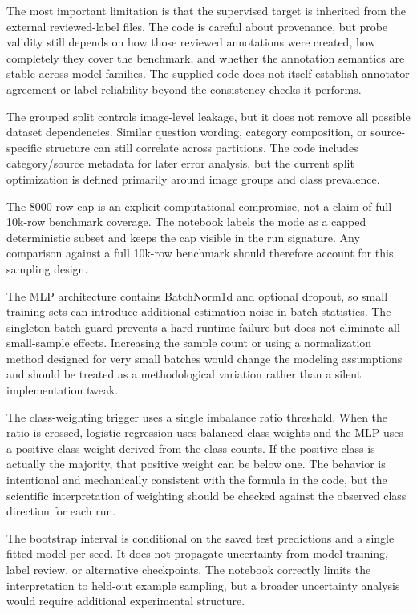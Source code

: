 \documentclass[11pt,a4paper]{article}
\begin{document}
The most important limitation is that the supervised target is inherited from the external reviewed-label files. The code is careful about provenance, but probe validity still depends on how those reviewed annotations were created, how completely they cover the benchmark, and whether the annotation semantics are stable across model families. The supplied code does not itself establish annotator agreement or label reliability beyond the consistency checks it performs.

The grouped split controls image-level leakage, but it does not remove all possible dataset dependencies. Similar question wording, category composition, or source-specific structure can still correlate across partitions. The code includes category/source metadata for later error analysis, but the current split optimization is defined primarily around image groups and class prevalence.

The 8000-row cap is an explicit computational compromise, not a claim of full 10k-row benchmark coverage. The notebook labels the mode as a capped deterministic subset and keeps the cap visible in the run signature. Any comparison against a full 10k-row benchmark should therefore account for this sampling design.

The MLP architecture contains BatchNorm1d and optional dropout, so small training sets can introduce additional estimation noise in batch statistics. The singleton-batch guard prevents a hard runtime failure but does not eliminate all small-sample effects. Increasing the sample count or using a normalization method designed for very small batches would change the modeling assumptions and should be treated as a methodological variation rather than a silent implementation tweak.

The class-weighting trigger uses a single imbalance ratio threshold. When the ratio is crossed, logistic regression uses balanced class weights and the MLP uses a positive-class weight derived from the class counts. If the positive class is actually the majority, that positive weight can be below one. The behavior is intentional and mechanically consistent with the formula in the code, but the scientific interpretation of weighting should be checked against the observed class direction for each run.

The bootstrap interval is conditional on the saved test predictions and a single fitted model per seed. It does not propagate uncertainty from model training, label review, or alternative checkpoints. The notebook correctly limits the interpretation to held-out example sampling, but a broader uncertainty analysis would require additional experimental structure.
\end{document}
